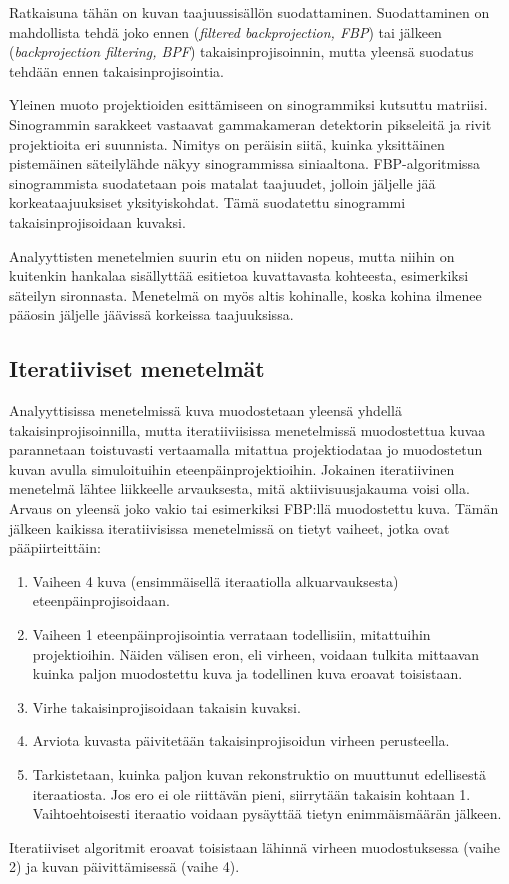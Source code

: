 Ratkaisuna tähän on kuvan taajuussisällön suodattaminen\cite{stiller_basics_2018, bruyant_analytic_2002}. Suodattaminen on mahdollista tehdä joko ennen (\textit{filtered backprojection, FBP}) tai jälkeen (\textit{backprojection filtering, BPF}) takaisinprojisoinnin, mutta yleensä suodatus tehdään ennen takaisinprojisointia.\cite{bruyant_analytic_2002}

Yleinen muoto projektioiden esittämiseen on sinogrammiksi kutsuttu matriisi. Sinogrammin sarakkeet vastaavat gammakameran detektorin pikseleitä ja rivit projektioita eri suunnista\cite{stiller_basics_2018}. Nimitys on peräisin siitä, kuinka yksittäinen pistemäinen säteilylähde näkyy sinogrammissa siniaaltona. FBP-algoritmissa sinogrammista suodatetaan pois matalat taajuudet, jolloin jäljelle jää korkeataajuuksiset yksityiskohdat. Tämä suodatettu sinogrammi takaisinprojisoidaan kuvaksi\cite{bruyant_analytic_2002}.

Analyyttisten menetelmien suurin etu on niiden nopeus, mutta niihin on kuitenkin hankalaa sisällyttää esitietoa kuvattavasta kohteesta, esimerkiksi säteilyn sironnasta. Menetelmä on myös altis kohinalle, koska kohina ilmenee pääosin jäljelle jäävissä korkeissa taajuuksissa.\cite{bruyant_analytic_2002, stiller_basics_2018}

\subsection{Iteratiiviset menetelmät}
Analyyttisissa menetelmissä kuva muodostetaan yleensä yhdellä takaisinprojisoinnilla, mutta iteratiiviisissa menetelmissä muodostettua kuvaa parannetaan toistuvasti vertaamalla mitattua projektiodataa jo muodostetun kuvan avulla simuloituihin eteenpäinprojektioihin. Jokainen iteratiivinen menetelmä lähtee liikkeelle arvauksesta, mitä aktiivisuusjakauma voisi olla. Arvaus on yleensä joko vakio tai esimerkiksi FBP:llä muodostettu kuva. Tämän jälkeen kaikissa iteratiivisissa menetelmissä on tietyt vaiheet, jotka ovat pääpiirteittäin\cite{bruyant_analytic_2002, beister_iterative_2012, stiller_basics_2018, ljungberg_spectct_2018}:
\begin{enumerate}[1.]
    \item Vaiheen 4 kuva (ensimmäisellä iteraatiolla alkuarvauksesta) eteenpäinprojisoidaan. 
    \item Vaiheen 1 eteenpäinprojisointia verrataan todellisiin, mitattuihin projektioihin. Näiden välisen eron, eli virheen, voidaan tulkita mittaavan kuinka paljon muodostettu kuva ja todellinen kuva eroavat toisistaan.
    \item Virhe takaisinprojisoidaan takaisin kuvaksi. 
    \item Arviota kuvasta päivitetään takaisinprojisoidun virheen perusteella.
    \item Tarkistetaan, kuinka paljon kuvan rekonstruktio on muuttunut edellisestä iteraatiosta. Jos ero ei ole riittävän pieni, siirrytään takaisin kohtaan 1. Vaihtoehtoisesti iteraatio voidaan pysäyttää tietyn enimmäismäärän jälkeen.
\end{enumerate}
Iteratiiviset algoritmit eroavat toisistaan lähinnä virheen muodostuksessa (vaihe 2) ja kuvan päivittämisessä (vaihe 4)\cite{bruyant_analytic_2002}.

